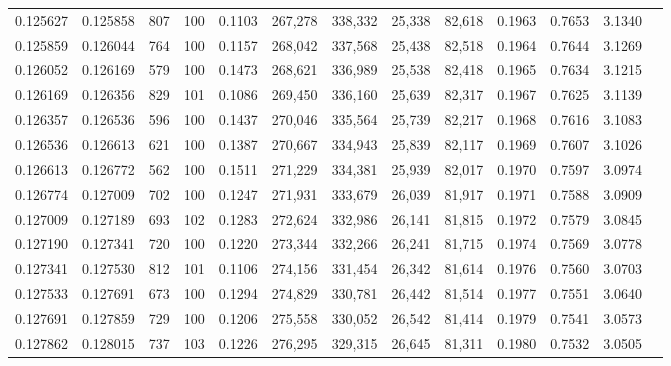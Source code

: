 \begin{tabular}{rrrrrrrrrrrrr}
0.125627 & 0.125858 &   807 & 100 &                                     0.1103 & 267,278 & 338,332 &  25,338 &  82,618 & 0.1963 & 0.7653 & 3.1340 \\
0.125859 & 0.126044 &   764 & 100 &                                     0.1157 & 268,042 & 337,568 &  25,438 &  82,518 & 0.1964 & 0.7644 & 3.1269 \\
0.126052 & 0.126169 &   579 & 100 &                                     0.1473 & 268,621 & 336,989 &  25,538 &  82,418 & 0.1965 & 0.7634 & 3.1215 \\
0.126169 & 0.126356 &   829 & 101 &                                     0.1086 & 269,450 & 336,160 &  25,639 &  82,317 & 0.1967 & 0.7625 & 3.1139 \\
0.126357 & 0.126536 &   596 & 100 &                                     0.1437 & 270,046 & 335,564 &  25,739 &  82,217 & 0.1968 & 0.7616 & 3.1083 \\
0.126536 & 0.126613 &   621 & 100 &                                     0.1387 & 270,667 & 334,943 &  25,839 &  82,117 & 0.1969 & 0.7607 & 3.1026 \\
0.126613 & 0.126772 &   562 & 100 &                                     0.1511 & 271,229 & 334,381 &  25,939 &  82,017 & 0.1970 & 0.7597 & 3.0974 \\
0.126774 & 0.127009 &   702 & 100 &                                     0.1247 & 271,931 & 333,679 &  26,039 &  81,917 & 0.1971 & 0.7588 & 3.0909 \\
0.127009 & 0.127189 &   693 & 102 &                                     0.1283 & 272,624 & 332,986 &  26,141 &  81,815 & 0.1972 & 0.7579 & 3.0845 \\
0.127190 & 0.127341 &   720 & 100 &                                     0.1220 & 273,344 & 332,266 &  26,241 &  81,715 & 0.1974 & 0.7569 & 3.0778 \\
0.127341 & 0.127530 &   812 & 101 &                                     0.1106 & 274,156 & 331,454 &  26,342 &  81,614 & 0.1976 & 0.7560 & 3.0703 \\
0.127533 & 0.127691 &   673 & 100 &                                     0.1294 & 274,829 & 330,781 &  26,442 &  81,514 & 0.1977 & 0.7551 & 3.0640 \\
0.127691 & 0.127859 &   729 & 100 &                                     0.1206 & 275,558 & 330,052 &  26,542 &  81,414 & 0.1979 & 0.7541 & 3.0573 \\
0.127862 & 0.128015 &   737 & 103 &                                     0.1226 & 276,295 & 329,315 &  26,645 &  81,311 & 0.1980 & 0.7532 & 3.0505 \\

\end{tabular}

